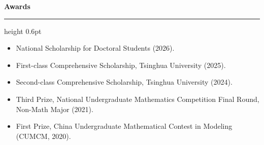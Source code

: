 \documentclass[10pt]{article}
\newcommand{\cvsection}[1]{%
  \vspace{0.75em}
  {\large\bfseries\color{accent} #1}\par
  \vspace{0.2em}
  {\color{rule}\hrule height 0.6pt}
  \vspace{0.45em}
}
\begin{document}
\cvsection{Awards}
\begin{itemize}[leftmargin=1.25em,itemsep=2pt,topsep=2pt]
  \item National Scholarship for Doctoral Students (2026).
  \item First-class Comprehensive Scholarship, Tsinghua University (2025).
  \item Second-class Comprehensive Scholarship, Tsinghua University (2024).
  \item Third Prize, National Undergraduate Mathematics Competition Final Round, Non-Math Major (2021).
  \item First Prize, China Undergraduate Mathematical Contest in Modeling (CUMCM, 2020).
\end{itemize}
\end{document}
